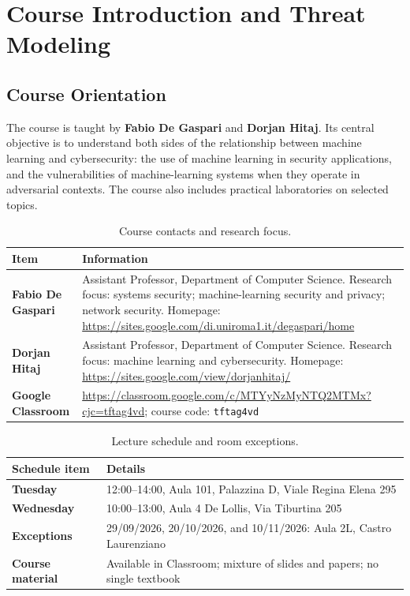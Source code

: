 \documentclass[11pt,a4paper]{report}
\begin{document}
\chapter{Course Introduction and Threat Modeling}

\section{Course Orientation}

The course is taught by \textbf{Fabio De Gaspari} and \textbf{Dorjan Hitaj}. Its central objective is to understand both sides of the relationship between machine learning and cybersecurity: the use of machine learning in security applications, and the vulnerabilities of machine-learning systems when they operate in adversarial contexts. The course also includes practical laboratories on selected topics.

\begin{table}[H]
\centering
\caption{Course contacts and research focus.}
\begin{tabularx}{\textwidth}{>{\bfseries}p{}>{\raggedright\arraybackslash}X}
\toprule
\rowcolor{Primary}
\color{white}Item & \color{white}Information \\
\midrule
Fabio De Gaspari & Assistant Professor, Department of Computer Science. Research focus: systems security; machine-learning security and privacy; network security. Homepage: \url{https://sites.google.com/di.uniroma1.it/degaspari/home} \\
Dorjan Hitaj & Assistant Professor, Department of Computer Science. Research focus: machine learning and cybersecurity. Homepage: \url{https://sites.google.com/view/dorjanhitaj/} \\
Google Classroom & \url{https://classroom.google.com/c/MTYyNzMyNTQ2MTMx?cjc=tftag4vd}; course code: \texttt{tftag4vd} \\
\bottomrule
\end{tabularx}
\end{table}

\begin{table}[H]
\centering
\caption{Lecture schedule and room exceptions.}
\begin{tabularx}{\textwidth}{>{\bfseries}p{}X}
\toprule
\rowcolor{Primary}
\color{white}Schedule item & \color{white}Details \\
\midrule
Tuesday & 12:00--14:00, Aula 101, Palazzina D, Viale Regina Elena 295 \\
Wednesday & 10:00--13:00, Aula 4 De Lollis, Via Tiburtina 205 \\
Exceptions & 29/09/2026, 20/10/2026, and 10/11/2026: Aula 2L, Castro Laurenziano \\
Course material & Available in Classroom; mixture of slides and papers; no single textbook \\
\bottomrule
\end{tabularx}
\end{table}
\end{document}
